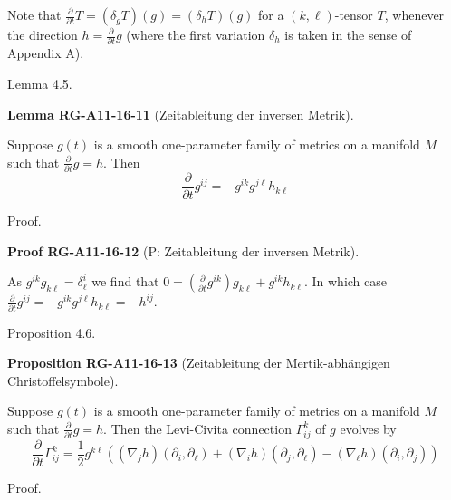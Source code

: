 \documentclass[10pt, letterpaper]{article}
\newcommand{\CustomHeading}[3]{%
  \par\medskip\noindent%
  \textbf{#1 #2} \textnormal{(#3)}.\enskip%
}
\newenvironment{PROP}[2]{\begin{unitbox}\CustomHeading{Proposition}{#1}{#2}}{\end{unitbox}}
\newenvironment{LEM}[2]{\begin{unitbox}\CustomHeading{Lemma}{#1}{#2}}{\end{unitbox}}
\newenvironment{PROOF}[2]{\begin{unitbox}\CustomHeading{Proof}{#1}{#2}}{\end{unitbox}}
\begin{document}
Note that $\frac{\partial}{\partial t} T=\left(\delta_{\dot{g}} T\right)(g)=\left(\delta_{h} T\right)(g)$ for a $(k, \ell)$-tensor $T$, whenever the direction $h=\frac{\partial}{\partial t} g$ (where the first variation $\delta_{h}$ is taken in the sense of Appendix A).



Lemma 4.5. 


\begin{LEM}{RG-A11-16-11}{Zeitableitung der inversen Metrik}
Suppose $g(t)$ is a smooth one-parameter family of metrics on a manifold $M$ such that $\frac{\partial}{\partial t} g=h$. Then
$$
\frac{\partial}{\partial t} g^{i j}=-g^{i k} g^{j \ell} h_{k \ell}
$$
\end{LEM}

Proof. 

\begin{PROOF}{RG-A11-16-12}{P: Zeitableitung der inversen Metrik}
As $g^{i k} g_{k \ell}=\delta_{\ell}^{i}$ we find that $0=\left(\frac{\partial}{\partial t} g^{i k}\right) g_{k \ell}+g^{i k} h_{k \ell}$. In which case $\frac{\partial}{\partial t} g^{i j}=-g^{i k} g^{j \ell} h_{k \ell}=-h^{i j}$.
\end{PROOF}



Proposition 4.6. 

\begin{PROP}{RG-A11-16-13}{Zeitableitung der Mertik-abhängigen Christoffelsymbole}
Suppose $g(t)$ is a smooth one-parameter family of metrics on a manifold $M$ such that $\frac{\partial}{\partial t} g=h$. Then the Levi-Civita connection $\Gamma_{i j}^{k}$ of $g$ evolves by
$$
\frac{\partial}{\partial t} \Gamma_{i j}^{k}=\frac{1}{2} g^{k \ell}\left(\left(\nabla_{j} h\right)\left(\partial_{i}, \partial_{\ell}\right)+\left(\nabla_{i} h\right)\left(\partial_{j}, \partial_{\ell}\right)-\left(\nabla_{\ell} h\right)\left(\partial_{i}, \partial_{j}\right)\right)
$$
\end{PROP}



Proof. 
\end{document}
